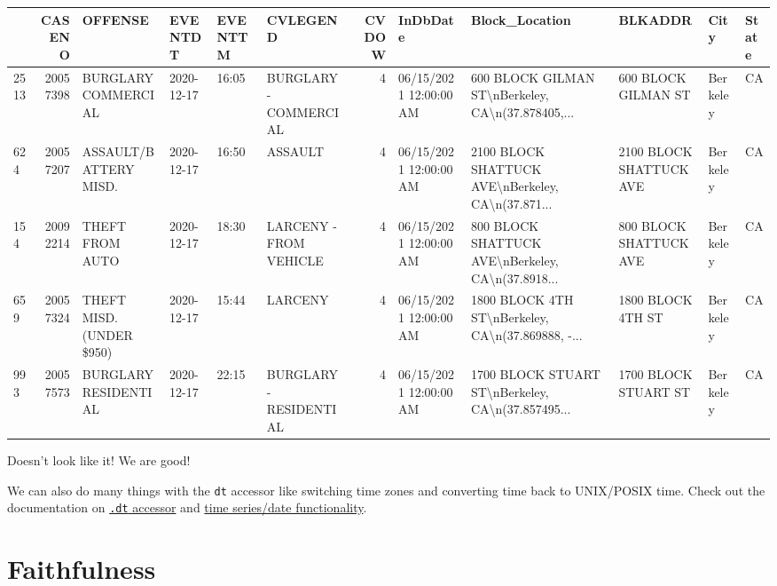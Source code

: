 \documentclass[
  letterpaper,
  DIV=11,
  numbers=noendperiod]{scrreprt}
\begin{document}
\begin{tabular}{lrllllrlllll}
\toprule
{} &    CASENO &                   OFFENSE &    EVENTDT & EVENTTM &                CVLEGEND &  CVDOW &                InDbDate &                                     Block\_Location &                  BLKADDR &      City & State \\
\midrule
2513 &  20057398 &       BURGLARY COMMERCIAL & 2020-12-17 &   16:05 &   BURGLARY - COMMERCIAL &      4 &  06/15/2021 12:00:00 AM &  600 BLOCK GILMAN ST\textbackslash nBerkeley, CA\textbackslash n(37.878405,... &      600 BLOCK GILMAN ST &  Berkeley &    CA \\
624  &  20057207 &     ASSAULT/BATTERY MISD. & 2020-12-17 &   16:50 &                 ASSAULT &      4 &  06/15/2021 12:00:00 AM &  2100 BLOCK SHATTUCK AVE\textbackslash nBerkeley, CA\textbackslash n(37.871... &  2100 BLOCK SHATTUCK AVE &  Berkeley &    CA \\
154  &  20092214 &           THEFT FROM AUTO & 2020-12-17 &   18:30 &  LARCENY - FROM VEHICLE &      4 &  06/15/2021 12:00:00 AM &  800 BLOCK SHATTUCK AVE\textbackslash nBerkeley, CA\textbackslash n(37.8918... &   800 BLOCK SHATTUCK AVE &  Berkeley &    CA \\
659  &  20057324 &  THEFT MISD. (UNDER \$950) & 2020-12-17 &   15:44 &                 LARCENY &      4 &  06/15/2021 12:00:00 AM &  1800 BLOCK 4TH ST\textbackslash nBerkeley, CA\textbackslash n(37.869888, -... &        1800 BLOCK 4TH ST &  Berkeley &    CA \\
993  &  20057573 &      BURGLARY RESIDENTIAL & 2020-12-17 &   22:15 &  BURGLARY - RESIDENTIAL &      4 &  06/15/2021 12:00:00 AM &  1700 BLOCK STUART ST\textbackslash nBerkeley, CA\textbackslash n(37.857495... &     1700 BLOCK STUART ST &  Berkeley &    CA \\
\bottomrule
\end{tabular}

Doesn't look like it! We are good!

We can also do many things with the \texttt{dt} accessor like switching
time zones and converting time back to UNIX/POSIX time. Check out the
documentation on
\href{https://pandas.pydata.org/docs/user_guide/basics.html\#basics-dt-accessors}{\texttt{.dt}
accessor} and
\href{https://pandas.pydata.org/docs/user_guide/timeseries.html\#}{time
series/date functionality}.

\hypertarget{faithfulness}{%
\section{Faithfulness}\label{faithfulness}}
\end{document}
